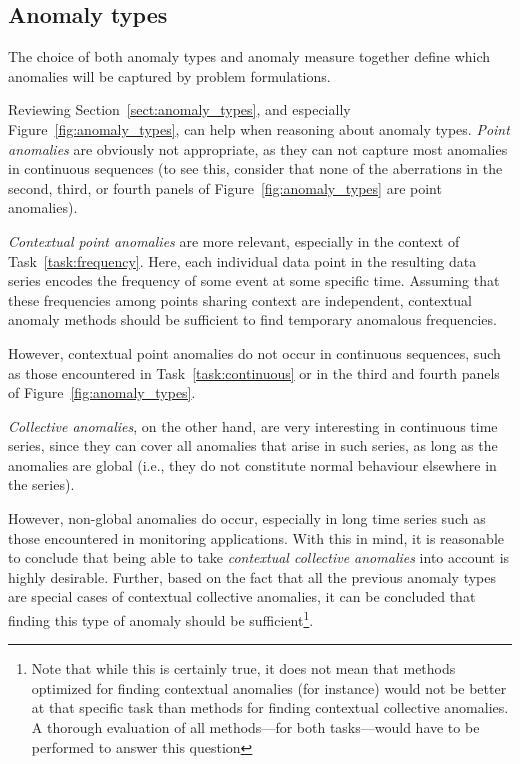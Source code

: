 \subsection{Anomaly types}

The choice of both anomaly types and anomaly measure together define which anomalies will be captured by problem formulations.

Reviewing Section~\ref{sect:anomaly_types}, and especially Figure~\ref{fig:anomaly_types}, can help when reasoning about anomaly types. \emph{Point anomalies} are obviously not appropriate, as they can not capture most anomalies in continuous sequences (to see this, consider that none of the aberrations in the second, third, or fourth panels of Figure~\ref{fig:anomaly_types} are point anomalies).

\emph{Contextual point anomalies} are more relevant, especially in the context of Task~\ref{task:frequency}. Here, each individual data point in the resulting data series encodes the frequency of some event at some specific time. Assuming that these frequencies among points sharing context are independent, contextual anomaly methods should be sufficient to find temporary anomalous frequencies.

However, contextual point anomalies do not occur in continuous sequences, such as those encountered in Task~\ref{task:continuous} or in the third and fourth panels of Figure~\ref{fig:anomaly_types}.

\emph{Collective anomalies}, on the other hand, are very interesting in continuous time series, since they can cover all anomalies that arise in such series, as long as the anomalies are global (i.e.\@, they do not constitute normal behaviour elsewhere in the series).

However, non-global anomalies do occur, especially in long time series such as those encountered in monitoring applications. With this in mind, it is reasonable to conclude that being able to take \emph{contextual collective anomalies} into account is highly desirable. Further, based on the fact that all the previous anomaly types are special cases of contextual collective anomalies, it can be concluded that finding this type of anomaly should be sufficient\footnote{Note that while this is certainly true, it does not mean that methods optimized for finding contextual anomalies (for instance) would not be better at that specific task than methods for finding contextual collective anomalies. A thorough evaluation of all methods---for both tasks---would have to be performed to answer this question}.

